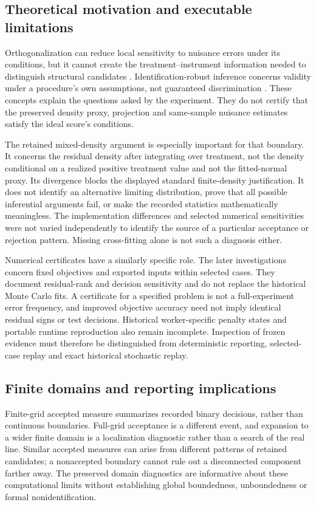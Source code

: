 \subsection{Theoretical motivation and executable limitations}
Orthogonalization can reduce local sensitivity to nuisance errors under its conditions, but it cannot create the treatment--instrument information needed to distinguish structural candidates \parencite{chernozhukov_et_al_2018}. Identification-robust inference concerns validity under a procedure's own assumptions, not guaranteed discrimination \parencite{chernozhukov_hansen_2008,jun_2008}. These concepts explain the questions asked by the experiment. They do not certify that the preserved density proxy, projection and same-sample nuisance estimates satisfy the ideal score's conditions.

The retained mixed-density argument is especially important for that boundary. It concerns the residual density after integrating over treatment, not the density conditional on a realized positive treatment value and not the fitted-normal proxy. Its divergence blocks the displayed standard finite-density justification. It does not identify an alternative limiting distribution, prove that all possible inferential arguments fail, or make the recorded statistics mathematically meaningless. The implementation differences and selected numerical sensitivities were not varied independently to identify the source of a particular acceptance or rejection pattern. Missing cross-fitting alone is not such a diagnosis either.

Numerical certificates have a similarly specific role. The later investigations concern fixed objectives and exported inputs within selected cases. They document residual-rank and decision sensitivity and do not replace the historical Monte Carlo fits. A certificate for a specified problem is not a full-experiment error frequency, and improved objective accuracy need not imply identical residual signs or test decisions. Historical worker-specific penalty states and portable runtime reproduction also remain incomplete. Inspection of frozen evidence must therefore be distinguished from deterministic reporting, selected-case replay and exact historical stochastic replay.

\subsection{Finite domains and reporting implications}
Finite-grid accepted measure summarizes recorded binary decisions, rather than continuous boundaries. Full-grid acceptance is a different event, and expansion to a wider finite domain is a localization diagnostic rather than a search of the real line. Similar accepted measures can arise from different patterns of retained candidates; a nonaccepted boundary cannot rule out a disconnected component farther away. The preserved domain diagnostics are informative about these computational limits without establishing global boundedness, unboundedness or formal nonidentification.

